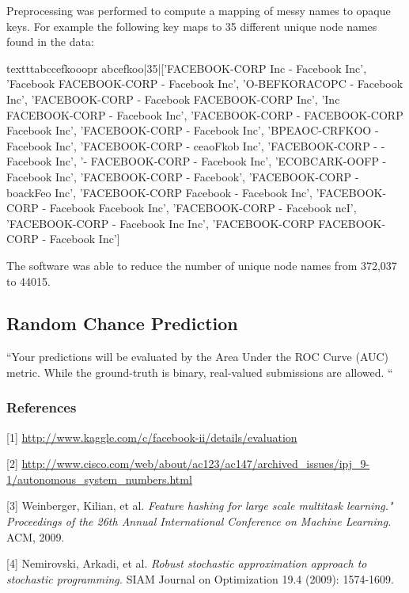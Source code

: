 \documentclass{article} %
\begin{document}
Preprocessing was performed to compute a mapping of messy names to opaque
keys.  For example the following key maps to 35 different unique node names
found in the data:

{\small texttt{abccefkooopr abcefkoo|35|['FACEBOOK-CORP Inc - Facebook Inc', 'Facebook FACEBOOK-CORP - Facebook Inc', 'O-BEFKORACOPC - Facebook Inc', 'FACEBOOK-CORP - Facebook FACEBOOK-CORP Inc', 'Inc FACEBOOK-CORP - Facebook Inc', 'FACEBOOK-CORP - FACEBOOK-CORP Facebook Inc', 'FACEBOOK-CORP - Facebook Inc', 'BPEAOC-CRFKOO - Facebook Inc', 'FACEBOOK-CORP - ceaoFkob Inc', 'FACEBOOK-CORP - - Facebook Inc', '- FACEBOOK-CORP - Facebook Inc', 'ECOBCARK-OOFP - Facebook Inc', 'FACEBOOK-CORP - Facebook', 'FACEBOOK-CORP - boackFeo Inc', 'FACEBOOK-CORP Facebook - Facebook Inc', 'FACEBOOK-CORP - Facebook Facebook Inc', 'FACEBOOK-CORP - Facebook ncI', 'FACEBOOK-CORP - Facebook Inc Inc', 'FACEBOOK-CORP FACEBOOK-CORP - Facebook Inc']
}}

The software was able to reduce the number of unique node names from 372,037 to 44015.

\subsection{Random Chance Prediction}

``Your predictions will be evaluated by the Area Under the ROC Curve (AUC) metric.  While the ground-truth is binary, real-valued submissions are allowed. ``

\subsubsection*{References}

\small{
[1] \url{http://www.kaggle.com/c/facebook-ii/details/evaluation}

[2] \url{http://www.cisco.com/web/about/ac123/ac147/archived_issues/ipj_9-1/autonomous_system_numbers.html}

[3]  Weinberger, Kilian, et al. {\it Feature hashing for large scale multitask learning." Proceedings of the 26th Annual International Conference on Machine Learning.} ACM, 2009.

[4] Nemirovski, Arkadi, et al. {\it Robust stochastic approximation approach to stochastic programming.} SIAM Journal on Optimization 19.4 (2009): 1574-1609.
}
\end{document}
